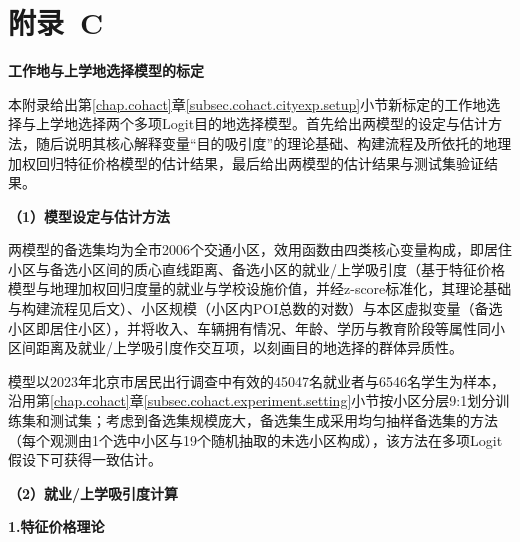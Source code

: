 
\setlength{\baselineskip}{16pt}
\chapter{附录~C}\label{appen.c}

\renewcommand{\thetable}{C-\arabic{table}}
\renewcommand{\thefigure}{C-\arabic{figure}}
\renewcommand{\theequation}{C-\arabic{equation}}
\setcounter{table}{0}
\setcounter{figure}{0}
\setcounter{equation}{0}

\begin{center}
\textbf{工作地与上学地选择模型的标定}
\end{center}

本附录给出第\ref{chap.cohact}章\ref{subsec.cohact.cityexp.setup}小节新标定的工作地选择与上学地选择两个多项Logit目的地选择模型。首先给出两模型的设定与估计方法，随后说明其核心解释变量``目的吸引度''的理论基础、构建流程及所依托的地理加权回归特征价格模型的估计结果，最后给出两模型的估计结果与测试集验证结果。

\textbf{（1）模型设定与估计方法}

两模型的备选集均为全市2006个交通小区，效用函数由四类核心变量构成，即居住小区与备选小区间的质心直线距离、备选小区的就业/上学吸引度（基于特征价格模型与地理加权回归度量的就业与学校设施价值，并经z-score标准化，其理论基础与构建流程见后文）、小区规模（小区内POI总数的对数）与本区虚拟变量（备选小区即居住小区），并将收入、车辆拥有情况、年龄、学历与教育阶段等属性同小区间距离及就业/上学吸引度作交互项，以刻画目的地选择的群体异质性。

模型以2023年北京市居民出行调查中有效的45047名就业者与6546名学生为样本，沿用第\ref{chap.cohact}章\ref{subsec.cohact.experiment.setting}小节按小区分层9:1划分训练集和测试集；考虑到备选集规模庞大，备选集生成采用均匀抽样备选集的方法（每个观测由1个选中小区与19个随机抽取的未选小区构成），该方法在多项Logit假设下可获得一致估计\citep{mcfaddenModellingChoiceResidential1977}。

\textbf{（2）就业/上学吸引度计算}

\textbf{1.特征价格理论}

